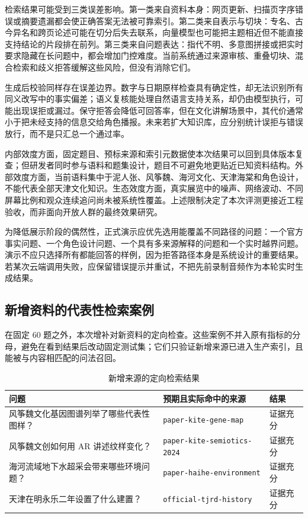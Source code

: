 \documentclass[UTF8,zihao=-4,fontset=none,twoside]{ctexart}
\newcommand{\code}[1]{\mbox{\texttt{#1}}\nobreak}
\begin{document}
检索结果可能受到三类误差影响。第一类来自资料本身：网页更新、扫描页字序错误或摘要遗漏都会使正确答案无法被可靠索引。第二类来自表示与切块：专名、古今异名和跨页论述可能在切分后失去联系，向量模型也可能把主题相近但不能直接支持结论的片段排在前列。第三类来自问题表达：指代不明、多意图拼接或把实时要求隐藏在长问题中，都会增加门控难度。当前系统通过来源审核、重叠切块、混合检索和歧义拒答缓解这些风险，但没有消除它们。

生成后校验同样存在误差边界。数字与日期原样检查具有确定性，却无法识别所有同义改写中的事实偏差；语义复核能处理自然语言支持关系，却仍由模型执行，可能出现误拒或漏过。保守拒答会降低可回答率，但在文化讲解场景中，其代价通常小于把未经支持的信息交给角色播报。未来若扩大知识库，应分别统计误拒与错误放行，而不是只汇总一个通过率。

内部效度方面，固定题目、预标来源和索引元数据使本次结果可以回到具体版本复查；但研发者同时参与语料和题集设计，题目不可避免地更贴近已知资料结构。外部效度方面，当前语料集中于泥人张、风筝魏、海河文化、天津海棠和角色设计，不能代表全部天津文化知识。生态效度方面，真实展览中的噪声、网络波动、不同屏幕比例和观众连续追问尚未被系统性覆盖。上述限制决定了本次评测更接近工程验收，而非面向开放人群的最终效果研究。

为降低展示阶段的偶然性，正式演示应优先选用能覆盖不同路径的问题：一个官方事实问题、一个角色设计问题、一个具有多来源解释的问题和一个实时越界问题。演示不应只选择所有都能回答的样例，因为拒答路径本身是系统设计的重要结果。若某次云端调用失败，应保留错误提示并重试，不把先前录制音频作为本轮实时生成结果。

\subsection{新增资料的代表性检索案例}

在固定 60 题之外，本次增补对新资料的定向检查。这些案例不并入原有指标的分母，避免在看到结果后改动固定测试集；它们只验证新增来源已进入生产索引，且能被与内容相匹配的问法召回。

\begin{table}[htbp]
\centering
\caption{新增来源的定向检索结果}
\label{tab:new-source-cases}
\small
\begin{tabularx}{\linewidth}{@{}Y P{47mm}C{20mm}@{}}
\toprule
问题 & 预期且实际命中的来源 & 结果 \\
\midrule
风筝魏文化基因图谱列举了哪些代表性图样？ & \code{paper-kite-gene-map} & 证据充分 \\
风筝魏文创如何用 AR 讲述纹样变化？ & \code{paper-kite-}\newline\code{semiotics-2024} & 证据充分 \\
海河流域地下水超采会带来哪些环境问题？ & \code{paper-haihe-environment} & 证据充分 \\
天津在明永乐二年设置了什么建置？ & \code{official-tjrd-history} & 证据充分 \\
\bottomrule
\end{tabularx}
\end{table}
\end{document}
